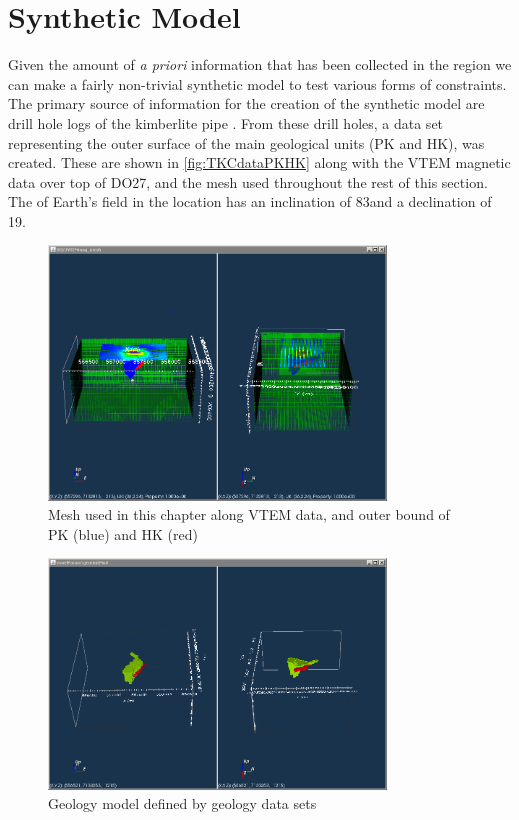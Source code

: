 \section{Synthetic Model}
\label{sec:Synthetic Model:TKC}
%
Given the amount of \emph{a priori} information that has been collected in the region we can make a fairly non-trivial synthetic model to test various forms of constraints. The primary source of information for the creation of the synthetic model are drill hole logs of the kimberlite pipe \cite{eggleston2014peregrine}. From these drill holes, a data set representing the outer surface of the main geological units (PK and HK), was created. These are shown in \autoref{fig:TKCdataPKHK} along with the VTEM magnetic data over top of DO27, and the mesh used throughout the rest of this section. The of Earth's field in the location has an inclination of 83\degree and a declination of 19\degree.
%
\begin{figure} [h]
   \centering
   \includegraphics[width=0.8\textwidth]{images/TKC/TKCdataPKHK.PNG}
   \caption{Mesh used in this chapter along VTEM data, and outer bound of PK (blue) and HK (red)}
   \label{fig:TKCdataPKHK}
\end{figure}
%

\begin{figure} [h]
   \centering
   \includegraphics[width=0.8\textwidth]{images/TKC/TKCgeoModel.PNG}
   \caption{Geology model defined by geology data sets}
   \label{fig:TKCgeoModel}
\end{figure}

